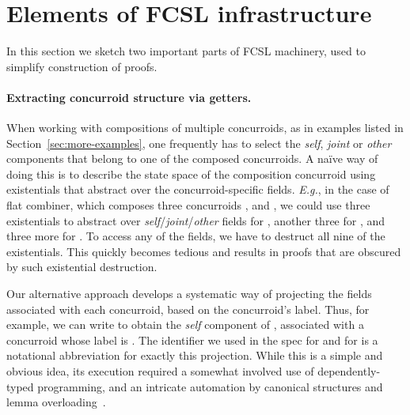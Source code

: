 
\section{Elements of FCSL infrastructure}
\label{sec:underhood}

In this section we sketch two important parts of FCSL machinery, used
to simplify construction of proofs.

\paragraph{Extracting concurroid structure via getters.~~}
\label{sec:getters}

When working with compositions of multiple concurroids, as in examples
listed in Section~\ref{sec:more-examples}, one frequently has to
select the \emph{self}, \emph{joint} or \emph{other} components that
belong to one of the composed concurroids. A na\"{i}ve way of doing this
is to describe the state space of the composition concurroid using 
existentials that abstract over the concurroid-specific
fields. \emph{E.g.}, in the case of flat combiner, which composes
three concurroids ,  and , we
could use three existentials to abstract over
\emph{self}/\emph{joint}/\emph{other} fields for , another
three for , and three more for . To access
any of the fields, we have to destruct all
nine of the existentials. This quickly becomes tedious and results in
proofs that are obscured by such existential destruction.

Our alternative approach develops a systematic way of projecting the
fields associated with each concurroid, based on the concurroid's
label. Thus, for example, we can write  to obtain
the \emph{self} component of , associated with a concurroid
whose label is . The identifier  we used in the
spec for  and for  is a notational
abbreviation for exactly this projection. While this is a simple and
obvious idea, its execution required a somewhat involved use of
dependently-typed programming, and an intricate automation by
canonical structures and lemma
overloading~\cite{Gonthier-al:ICFP11,Mahboubi-Tassi:ITP13}.

